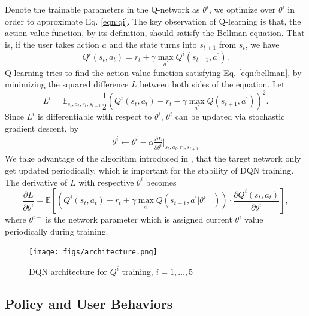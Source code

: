 \documentclass{sigchi}
\begin{document}
Denote the trainable parameters in the Q-network as $\theta^i$, we optimize over $\theta^i$ in order to approximate Eq. \eqref{eqn:qi}. The key observation of Q-learning is that, the action-value function, by its definition, should satisfy the Bellman equation. That is, if the user takes action $a$ and the state turns into $s_{t+1}$ from $s_t$, we have
\begin{equation}
Q^i(s_t,a_t)=r_{t} + \gamma \max_{a^\prime}Q^i(s_{t+1}, a^\prime). \label{eqn:bellman}
\end{equation}
Q-learning tries to find the action-value function satisfying Eq. \eqref{eqn:bellman}, by minimizing the squared difference $L$ between both sides of the equation. Let
\begin{equation*}
L^i=\mathbb{E}_{s_t, a_t, r_t, s_{t+1}} \frac{1}{2}(Q^i(s_t,a_t)- r_{t} - \gamma\max_{a^\prime}Q(s_{t+1}, a^\prime))^2.
\end{equation*}
Since $L^i$ is differentiable with respect to $\theta^i$, $\theta^i$ can be updated via stochastic gradient descent, by
\begin{eqnarray*}
\theta^i \leftarrow \theta^i - \alpha\frac{\partial L}{\partial \theta^i}\Big|_{s_t, a_t, r_t, s_{t+1}}
\end{eqnarray*}
We take advantage of the algorithm introduced in \cite{}, that the target network only get updated periodically, which is important for the stability of DQN training. The derivative of $L$ with respective $\theta^i$ becomes
$$\frac{\partial L}{\partial \theta^i} = \mathbb{E}\left[ (Q^i(s_t,a_t)- r_{t} + \gamma\max_{a^\prime}Q(s_{t+1}, a^\prime | \theta^{i -}))\cdot \frac{\partial{Q^i(s_t,a_t)}}{\partial{\theta^i}}\right],$$
where $\theta^{i-}$ is the network parameter which is assigned current $\theta^i$ value periodically during training.

\begin{figure}[t]
  \centering
  \texttt{[image: figs/architecture.png]}
  \caption{DQN architecture for $Q^i$ training, $i=1, \dots,5$}
  \label{fig:architecture}
\end{figure}

\subsection{Policy and User Behaviors}
\end{document}
